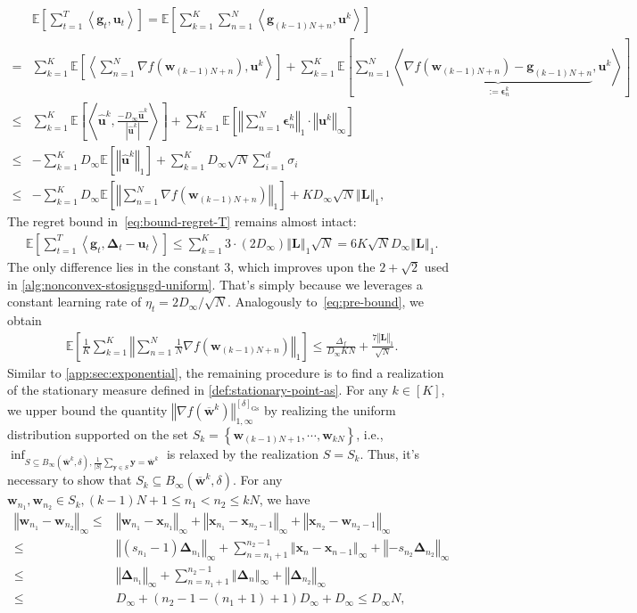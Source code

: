 \documentclass{article}
\def \y {\mathbf{y}}
\def \E {\mathbb{E}}
\def \x {\mathbf{x}}
\def \g {\mathbf{g}}
\def \u {\mathbf{u}}
\def \w {\mathbf{w}}
\def \uh {\widehat{\u}}
\def \Lb {\mathbf{L}}
\def \wb {\overline{\w}}
\newcommand{\inner}[2]{\left\langle #1, #2 \right\rangle}
\newcommand{\norm}[1]{\left\Vert#1\right\Vert}
\newcommand{\abs}[1]{\left|#1\right|}
\def \eps {\bm{\epsilon}}
\def \bDelta {\bm{\Delta}}
\newcommand{\sqbrac}[1]{\left[#1\right]}
\newcommand{\cbrac}[1]{\left\{#1\right\}}
\begin{document}
\begin{align*}
    &\E\sqbrac{\sum_{t=1}^T\inner{\g_t}{\u_t}}=\E\sqbrac{\sum_{k=1}^K\sum_{n=1}^N\inner{\g_{(k-1)N+n}}{\u^k}}\\=&\sum_{k=1}^K\E\sqbrac{\inner{\sum_{n=1}^N\nabla f(\w_{(k-1)N+n})}{\u^k}}+\sum_{k=1}^K\E\sqbrac{\sum_{n=1}^N\inner{\underbrace{\nabla f(\w_{(k-1)N+n})-\g_{(k-1)N+n}}_{:=\eps_n^k}}{\u^k}}\\\le&\sum_{k=1}^K\E\sqbrac{\inner{\uh^k}{\frac{-D_\infty\uh^k}{\abs{\uh^k}}}}+\sum_{k=1}^K\E\sqbrac{\norm{\sum_{n=1}^N\eps_n^k}_1\cdot\norm{\u^k}_\infty}\\\le&-\sum_{k=1}^KD_\infty\E\sqbrac{\norm{\uh^k}_1}+\sum_{k=1}^KD_\infty\sqrt{N}\sum_{i=1}^d\sigma_i\\\le&-\sum_{k=1}^KD_\infty\E\sqbrac{\norm{\sum_{n=1}^N\nabla f(\w_{(k-1)N+n})}_1}+KD_\infty\sqrt{N}\norm{\Lb}_1,
\end{align*}
The regret bound in~\eqref{eq:bound-regret-T} remains almost intact:
\begin{align*}
    \E\sqbrac{\sum_{t=1}^T\inner{\g_t}{\bDelta_t-\u_t}}\le\sum_{k=1}^K3\cdot(2D_\infty)\norm{\Lb}_1\sqrt{N}=6K\sqrt{N}D_\infty\norm{\Lb}_1.
\end{align*}
The only difference lies in the constant $3$, which improves upon the $2+\sqrt{2}$ used in \cref{alg:nonconvex-stosignsgd-uniform}. That's simply because we leverages a constant learning rate of $\eta_t=2D_\infty/\sqrt{N}$.
Analogously to~\eqref{eq:pre-bound}, we obtain
\begin{align}\label{eq:pre-bound-as}
    \E\sqbrac{\frac{1}{K}\sum_{k=1}^K\norm{\sum_{n=1}^N\frac{1}{N}\nabla f(\w_{(k-1)N+n})}_1}\le\frac{\Delta_f}{D_\infty KN}+\frac{7\norm{\Lb}_1}{\sqrt{N}}.
\end{align}
Similar to \cref{app:sec:exponential}, the remaining procedure is to find a realization of the stationary measure defined in \cref{def:stationary-point-as}. For any $k\in[K]$, we upper bound the quantity $\norm{\nabla f(\wb^k)}_{1,\infty}^{[\delta]_{\textrm{Gs}}}$ by realizing the uniform distribution supported on the set $S_k=\cbrac{\w_{(k-1)N+1},\cdots,\w_{kN}}$, i.e., $\inf_{S\subseteq B_\infty(\wb^k,\delta),\frac{1}{\abs{S}}\sum_{\y\in S}\y=\wb^k}$ is relaxed by the realization $S=S_k$. Thus, it's necessary to show that $S_k\subseteq B_\infty(\wb^k,\delta)$. For any $\w_{n_1},\w_{n_2}\in S_k, (k-1)N+1\le n_1<n_2\le kN$, we have
\begin{equation}\label{eq:Sk-diam-as}
    \begin{aligned}
        \norm{\w_{n_1}-\w_{n_2}}_\infty\le&\norm{\w_{n_1}-\x_{n_1}}_\infty+\norm{\x_{n_1}-\x_{n_2-1}}_\infty+\norm{\x_{n_2}-\w_{n_2-1}}_\infty\\
        \le&\norm{(s_{n_1}-1)\bDelta_{n_1}}_\infty+\sum_{n=n_1+1}^{n_2-1}\norm{\x_n-\x_{n-1}}_\infty+\norm{-s_{n_2}\bDelta_{n_2}}_\infty\\\le&\norm{\bDelta_{n_1}}_\infty+\sum_{n=n_1+1}^{n_2-1}\norm{\bDelta_n}_\infty+\norm{\bDelta_{n_2}}_\infty\\\le&D_\infty+(n_2-1-(n_1+1)+1)D_\infty+D_\infty\le D_\infty N,
    \end{aligned}
\end{equation}
\end{document}
